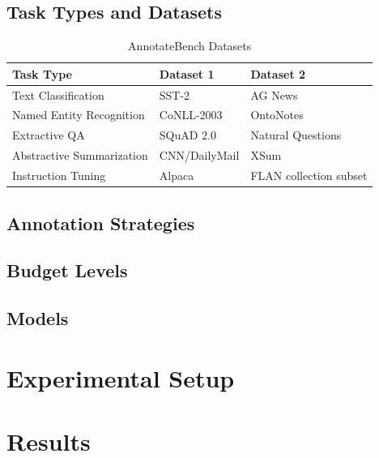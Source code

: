 \documentclass{article}
\begin{document}
\subsection{Task Types and Datasets}
\begin{table}[h!]
\centering
\caption{AnnotateBench Datasets}
\begin{tabular}{lll}
\toprule
\textbf{Task Type} & \textbf{Dataset 1} & \textbf{Dataset 2} \\
\midrule
Text Classification & SST-2 & AG News \\
Named Entity Recognition & CoNLL-2003 & OntoNotes \\
Extractive QA & SQuAD 2.0 & Natural Questions \\
Abstractive Summarization & CNN/DailyMail & XSum \\
Instruction Tuning & Alpaca & FLAN collection subset \\
\bottomrule
\end{tabular}
\end{table}

\subsection{Annotation Strategies}

\subsection{Budget Levels}

\subsection{Models}

\section{Experimental Setup}

\section{Results}
\end{document}
